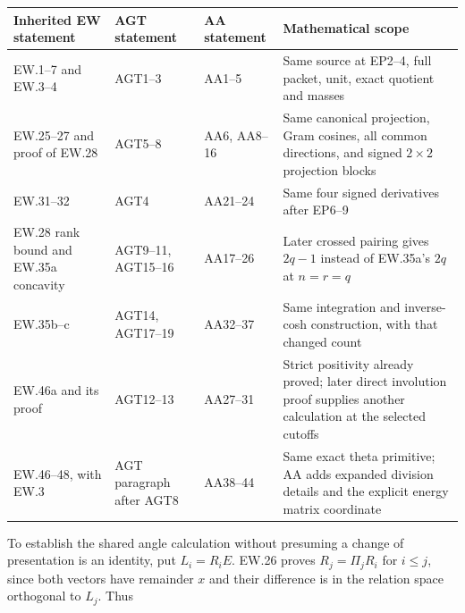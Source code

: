 {\scriptsize{} %
\begin{longtable}[]{@{}
  >{\raggedright\arraybackslash}p{}
  >{\raggedright\arraybackslash}p{}
  >{\raggedright\arraybackslash}p{}
  >{\raggedright\arraybackslash}p{}@{}}
\toprule\noalign{}
\begin{minipage}[b]{\linewidth}\raggedright
Inherited EW statement
\end{minipage} & \begin{minipage}[b]{\linewidth}\raggedright
AGT statement
\end{minipage} & \begin{minipage}[b]{\linewidth}\raggedright
AA statement
\end{minipage} & \begin{minipage}[b]{\linewidth}\raggedright
Mathematical scope
\end{minipage} \\
\midrule\noalign{}
\endhead
\bottomrule\noalign{}
\endlastfoot
EW.1--7 and EW.3--4 & AGT1--3 & AA1--5 & Same source at EP2--4, full packet, unit, exact quotient and masses \\
EW.25--27 and proof of EW.28 & AGT5--8 & AA6, AA8--16 & Same canonical projection, Gram cosines, all common directions, and signed \(2\times2\) projection blocks \\
EW.31--32 & AGT4 & AA21--24 & Same four signed derivatives after EP6--9 \\
EW.28 rank bound and EW.35a concavity & AGT9--11, AGT15--16 & AA17--26 & Later crossed pairing gives \(2q-1\) instead of EW.35a's \(2q\) at \(n=r=q\) \\
EW.35b--c & AGT14, AGT17--19 & AA32--37 & Same integration and inverse-cosh construction, with that changed count \\
EW.46a and its proof & AGT12--13 & AA27--31 & Strict positivity already proved; later direct involution proof supplies another calculation at the selected cutoffs \\
EW.46--48, with EW.3 & AGT paragraph after AGT8 & AA38--44 & Same exact theta primitive; AA adds expanded division details and the explicit energy matrix coordinate \\
\end{longtable}
}

To establish the shared angle calculation without presuming a change of presentation is an identity, put \(L_i=R_iE\). EW.26 proves \(R_j=\Pi_jR_i\) for \(i\le j\), since both vectors have remainder \(x\) and their difference is in the relation space orthogonal to \(L_j\). Thus

